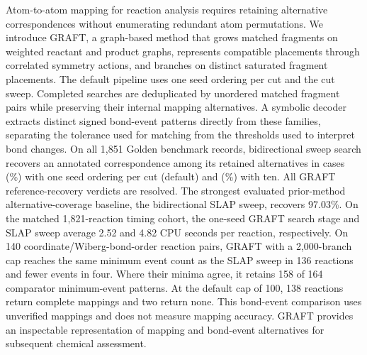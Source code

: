 Atom-to-atom mapping for reaction analysis requires retaining alternative correspondences without enumerating redundant atom permutations. We introduce GRAFT, a graph-based method that grows matched fragments on weighted reactant and product graphs, represents compatible placements through correlated symmetry actions, and branches on distinct saturated fragment placements. The default pipeline uses one seed ordering per cut and the cut sweep. Completed searches are deduplicated by unordered matched fragment pairs while preserving their internal mapping alternatives. A symbolic decoder extracts distinct signed bond-event patterns directly from these families, separating the tolerance used for matching from the thresholds used to interpret bond changes. On all 1,851 Golden benchmark records, bidirectional sweep search recovers an annotated correspondence among its retained alternatives in \GoldenOneRecovered{} cases (\GoldenOnePercent\%) with one seed ordering per cut (default) and \GoldenTenRecovered{} (\GoldenTenPercent\%) with ten. All GRAFT reference-recovery verdicts are resolved. The strongest evaluated prior-method alternative-coverage baseline, the bidirectional SLAP sweep, recovers 97.03\%. On the matched 1,821-reaction timing cohort, the one-seed GRAFT search stage and SLAP sweep average 2.52 and 4.82 CPU seconds per reaction, respectively. On 140 coordinate/Wiberg-bond-order reaction pairs, GRAFT with a 2,000-branch cap reaches the same minimum event count as the SLAP sweep in 136 reactions and fewer events in four. Where their minima agree, it retains 158 of 164 comparator minimum-event patterns. At the default cap of 100, 138 reactions return complete mappings and two return none. This bond-event comparison uses unverified mappings and does not measure mapping accuracy. GRAFT provides an inspectable representation of mapping and bond-event alternatives for subsequent chemical assessment.
